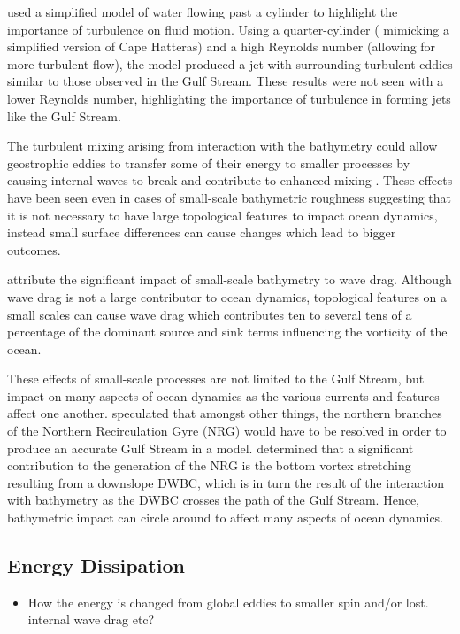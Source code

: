 \documentclass[..\EOYR.tex]{subfiles}
\begin{document}
\citep{Tansley2001} used a simplified model of water flowing past a cylinder to highlight the importance of turbulence on fluid motion. Using a quarter-cylinder ( mimicking a simplified version of Cape Hatteras) and a high Reynolds number (allowing for more turbulent flow), the model produced a jet with surrounding turbulent eddies similar to those observed in the Gulf Stream. These results were not seen with a lower Reynolds number, highlighting the importance of turbulence in forming jets like the Gulf Stream.

The turbulent mixing arising from interaction with the bathymetry could allow geostrophic eddies to transfer some of their energy to smaller processes by causing internal waves to break and contribute to enhanced mixing \citep{Nikurashin2012a}. These effects have been seen even in cases of small-scale bathymetric roughness suggesting that it is not necessary to have large topological features to impact ocean dynamics, instead small surface differences can cause changes which lead to bigger outcomes.

\citep{NaveiraGarabato2013} attribute the significant impact of small-scale bathymetry to wave drag. Although wave drag is not a large contributor to ocean dynamics, topological features on a small scales can cause wave drag which contributes ten to several tens of a percentage of the dominant source and sink terms influencing the vorticity of the ocean.


These effects of small-scale processes are not limited to the Gulf Stream, but impact on many aspects of ocean dynamics as the various currents and features affect one another. 
\citep{Ezer2016b} speculated that amongst other things, the northern branches of the Northern Recirculation Gyre (NRG) would have to be resolved in order to produce an accurate Gulf Stream in a model. \citep{Zhang2007} determined that a significant contribution to the generation of the NRG is the bottom vortex stretching resulting from a downslope DWBC, which is in turn the result of the interaction with bathymetry as the DWBC crosses the path of the Gulf Stream. Hence, bathymetric impact can circle around to affect many aspects of ocean dynamics.


\subsection{Energy Dissipation}
\begin{itemize}
    \item How the energy is changed from global eddies to smaller spin and/or lost. internal wave drag etc?
\end{itemize}
\end{document}
